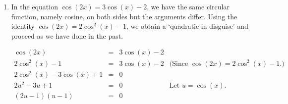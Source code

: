 {\begin{enumerate}
\[ \begin{array}{rclr}

\sec^{2}(x) &  = & \tan(x) + 3 & \\
1 + \tan^{2}(x) & = & \tan(x) + 3& \text{(Since $\sec^{2}(x) = 1 + \tan^{2}(x)$.)} \\
\tan^{2}(x) - \tan(x) -2 & = & 0 & \\
u^2 - u - 2 & = & 0 & \text{Let $u = \tan(x)$.} \\
(u + 1)(u - 2) & = & 0 & \\ \end{array} \]

This gives $u = -1$ or $u = 2$.  Since $u = \tan(x)$, we have $\tan(x) = -1$ or $\tan(x) = 2$. From $\tan(x) = -1$, we get $x = -\frac{\pi}{4} + \pi k$ for integers $k$.  To solve $\tan(x) = 2$, we employ the arctangent function and get $x = \arctan(2) + \pi k$ for integers $k$.  From the first set of solutions, we get $x = \frac{3\pi}{4}$ and $x = \frac{7\pi}{4}$ as our answers which lie in $[0,2\pi)$.  Using the same sort of argument we saw in Example \ref{TrigEqnEx1},   we get  $x=\arctan(2)$ and $x = \pi + \arctan(2)$ as answers from our second set of solutions which lie in $[0,2\pi)$.  We confirm our answers by plotting $y=\sec^2(x)$ and $y=\tan(x)+3$ in GeoGebra; see Figure \ref{fig:trigeg2-2}. (Again, if you are using a graphing calculator rather than software, you may need to use a reciprocal identity and rewrite the secant as a cosine and graph  $y = \frac{1}{(\cos(x))^2}$ and $y = \tan(x) + 3$ to find the $x$-values of the points where they intersect.)



\item  In the equation $\cos(2x) = 3\cos(x) - 2$, we have the same circular function, namely cosine, on both sides but the arguments differ.  Using the identity $\cos(2x) = 2\cos^{2}(x) - 1$, we obtain a `quadratic in disguise' and proceed as we have done in the past.

\[ \begin{array}{rclr}

\cos(2x) & = & 3\cos(x) - 2 & \\
2\cos^{2}(x) -1 & = & 3\cos(x) -2 & \text{(Since $\cos(2x) = 2\cos^{2}(x) -1$.)} \\
2\cos^{2}(x) - 3\cos(x) +1 & = & 0 & \\
2 u^2 - 3 u + 1 & = & 0 & \text{Let $u = \cos(x)$.}\\
(2u - 1)(u - 1) & = & 0 & \\ \end{array} \]


\end{enumerate}}
